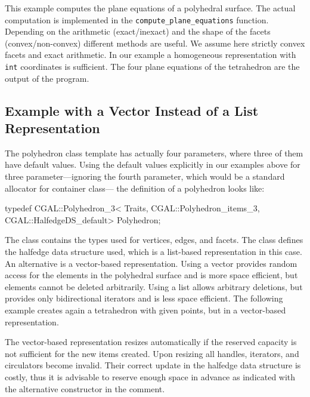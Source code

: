 This example computes the plane equations of a polyhedral surface.
The actual computation is implemented in the
\texttt{compute\_plane\_equations} function.  Depending on the arithmetic
(exact/inexact) and the shape of the facets (convex/non-convex)
different methods are useful. We assume here strictly convex facets
and exact arithmetic. In our example a homogeneous representation with
\texttt{int} coordinates is sufficient. The four plane equations of the
tetrahedron are the output of the program.


\subsection{Example with a Vector Instead of a List Representation}
\label{sectionPolyVector}

The polyhedron class template has actually four parameters, where
three of them have default values. Using the default values explicitly
in our examples above for three parameter---ignoring the fourth
parameter, which would be a standard allocator for container class---
the definition of a polyhedron looks like:

\begin{ccExampleCode}
typedef CGAL::Polyhedron_3< Traits, 
                            CGAL::Polyhedron_items_3, 
                            CGAL::HalfedgeDS_default>      Polyhedron;
\end{ccExampleCode}

The  class contains the types used for
vertices, edges, and facets. The  class
defines the halfedge data structure used, which is a list-based
representation in this case. An alternative is a vector-based
representation. Using a vector provides random
access for the elements in the polyhedral surface and is more space
efficient, but elements cannot be deleted arbitrarily. Using a list
allows arbitrary deletions, but provides only bidirectional iterators
and is less space efficient. The following example creates again a 
tetrahedron with given points, but in a vector-based representation.

The vector-based representation resizes automatically if the reserved
capacity is not sufficient for the new items created. Upon resizing
all handles, iterators, and circulators become invalid. Their correct
update in the halfedge data structure is costly, thus it is advisable
to reserve enough space in advance as indicated with the alternative
constructor in the comment. 

